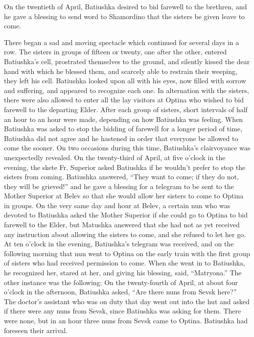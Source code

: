 On the twentieth of April, Batiushka desired to bid farewell to the brethren, and he gave a blessing to send word to Shamordino that the sisters be given leave to come.

There began a sad and moving spectacle which continued for several days in a row. The sisters in groups of fifteen or twenty, one after the other, entered Batiushka's cell, prostrated themselves to the ground, and silently kissed the dear hand with which he blessed them, and scarcely able to restrain their weeping, they left his cell. Batiushka looked upon all with his eyes, now filled with sorrow and suffering, and appeared to recognize each one. In alternation with the sisters, there were also allowed to enter all the lay visitors at Optina who wished to bid farewell to the departing Elder. After each group of sisters, short intervals of half an hour to an hour were made, depending on how Batiushka was feeling. When Batiushka was asked to stop the bidding of farewell for a longer period of time, Batiushka did not agree and he hastened in order that everyone be allowed to come the sooner. On two occasions during this time, Batiushka's clairvoyance was unexpectedly revealed. On the twenty-third of April, at five o'clock in the evening, the skete Fr. Superior asked Batiushka if he wouldn't prefer to stop the sisters from coming. Batiushka answered, ``They want to come; if they do not, they will be grieved!'' and he gave a blessing for a telegram to be sent to the Mother Superior at Belev so that she would allow her sisters to come to Optina in groups. On the very same day and hour at Belev, a certain nun who was devoted to Batiushka asked the Mother Superior if she could go to Optina to bid farewell to the Elder, but Matushka answered that she had not as yet received any instruction about allowing the sisters to come, and she refused to let her go. At ten o'clock in the evening, Batiushka's telegram was received, and on the following morning that nun went to Optina on the early train with the first group of sisters who had received permission to come. When she went in to Batiushka, he recognized her, stared at her, and giving his blessing, said, ``Matryona.'' The other instance was the following: On the twenty-fourth of April, at about four o'clock in the afternoon, Batiushka asked, ``Are there nuns from Sevsk here?'' The doctor's assistant who was on duty that day went out into the hut and asked if there were any nuns from Sevsk, since Batiushka was asking for them. There were none, but in an hour three nuns from Sevsk came to Optina. Batiushka had foreseen their arrival.

